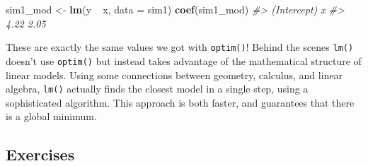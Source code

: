 \documentclass[]{book}
\newenvironment{Shaded}{\begin{snugshade}}{\end{snugshade}}
\newcommand{\KeywordTok}[1]{\textcolor[rgb]{0.13,0.29,0.53}{\textbf{{#1}}}}
\newcommand{\DataTypeTok}[1]{\textcolor[rgb]{0.13,0.29,0.53}{{#1}}}
\newcommand{\StringTok}[1]{\textcolor[rgb]{0.31,0.60,0.02}{{#1}}}
\newcommand{\CommentTok}[1]{\textcolor[rgb]{0.56,0.35,0.01}{\textit{{#1}}}}
\newcommand{\NormalTok}[1]{{#1}}
\begin{document}
\begin{Shaded}
\begin{Highlighting}[]
\NormalTok{sim1_mod <-}\StringTok{ }\KeywordTok{lm}\NormalTok{(y ~}\StringTok{ }\NormalTok{x, }\DataTypeTok{data =} \NormalTok{sim1)}
\KeywordTok{coef}\NormalTok{(sim1_mod)}
\CommentTok{#> (Intercept)           x }
\CommentTok{#>        4.22        2.05}
\end{Highlighting}
\end{Shaded}

These are exactly the same values we got with \texttt{optim()}! Behind
the scenes \texttt{lm()} doesn't use \texttt{optim()} but instead takes
advantage of the mathematical structure of linear models. Using some
connections between geometry, calculus, and linear algebra,
\texttt{lm()} actually finds the closest model in a single step, using a
sophisticated algorithm. This approach is both faster, and guarantees
that there is a global minimum.

\subsection{Exercises}\label{exercises-60}
\end{document}
